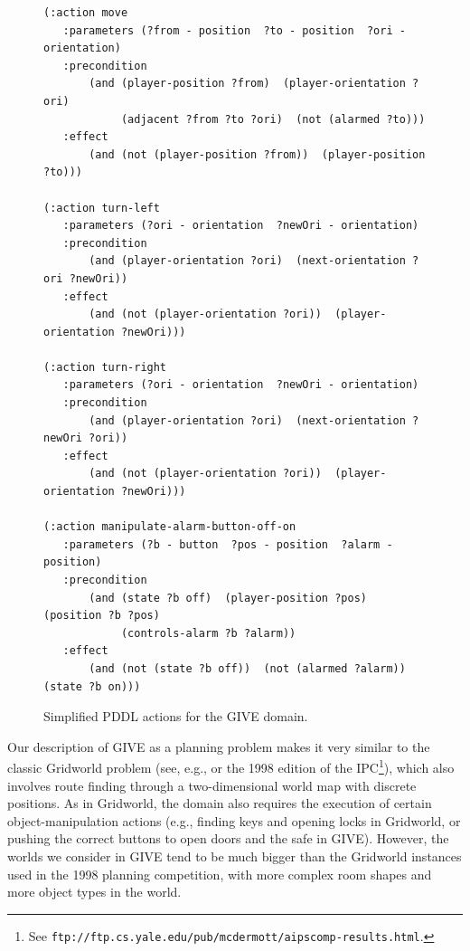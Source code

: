 \begin{figure}
\centering
\begin{minipage}{0.9\textwidth}
{\small%
\begin{verbatim}
(:action move
   :parameters (?from - position  ?to - position  ?ori - orientation)
   :precondition 
       (and (player-position ?from)  (player-orientation ?ori)
            (adjacent ?from ?to ?ori)  (not (alarmed ?to)))
   :effect 
       (and (not (player-position ?from))  (player-position ?to)))

(:action turn-left
   :parameters (?ori - orientation  ?newOri - orientation)
   :precondition 
       (and (player-orientation ?ori)  (next-orientation ?ori ?newOri))
   :effect 
       (and (not (player-orientation ?ori))  (player-orientation ?newOri)))

(:action turn-right
   :parameters (?ori - orientation  ?newOri - orientation)
   :precondition 
       (and (player-orientation ?ori)  (next-orientation ?newOri ?ori))
   :effect 
       (and (not (player-orientation ?ori))  (player-orientation ?newOri)))

(:action manipulate-alarm-button-off-on
   :parameters (?b - button  ?pos - position  ?alarm - position)
   :precondition 
       (and (state ?b off)  (player-position ?pos)  (position ?b ?pos)
            (controls-alarm ?b ?alarm))
   :effect
       (and (not (state ?b off))  (not (alarmed ?alarm))  (state ?b on)))
\end{verbatim}}%
\end{minipage}
\caption{Simplified PDDL actions for the GIVE domain.}
\label{fig:give-planning}
\end{figure}

Our description of GIVE as a planning problem makes it very similar to the
classic Gridworld problem (see, e.g., \citealt{Tovey-Koenig:2000}
or the 1998 edition of the IPC\footnote{See
\texttt{ftp://ftp.cs.yale.edu/pub/mcdermott/aipscomp-results.html}.}),
which also involves route finding through a two-dimensional world map with
discrete positions. As in Gridworld, the domain also requires the
execution of certain object-manipulation actions (e.g., finding keys and
opening locks in Gridworld, or pushing the correct buttons to open doors
and the safe in GIVE). However, the worlds we consider in GIVE tend to be
much bigger than the Gridworld instances used in the 1998 planning
competition, with more complex room shapes and more object types in the
world.

